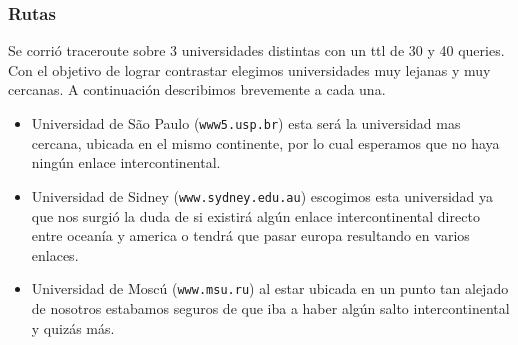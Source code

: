 \subsubsection*{Rutas}
Se corrió traceroute sobre 3 universidades distintas con un ttl de 30 y 40 queries. Con el objetivo de lograr contrastar elegimos universidades muy lejanas y muy cercanas. A continuación describimos brevemente a cada una.

\begin{itemize}
	\item Universidad de São Paulo (\texttt{www5.usp.br}) esta será la universidad mas cercana, ubicada en el mismo continente, por lo cual esperamos que no haya ningún enlace intercontinental.
	\item Universidad de Sidney (\texttt{www.sydney.edu.au}) escogimos esta universidad ya que nos surgió la duda de si existirá algún enlace intercontinental directo entre oceanía y america o tendrá que pasar europa resultando en varios enlaces.
	\item Universidad de Moscú (\texttt{www.msu.ru}) al estar ubicada en un punto tan alejado de nosotros estabamos seguros de que iba a haber algún salto intercontinental y quizás más.
\end{itemize}